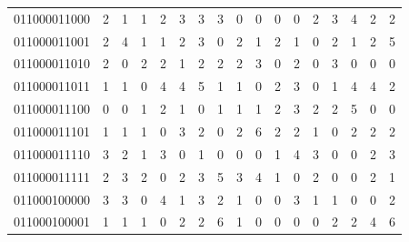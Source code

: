 \documentclass[10pt,a4paper]{article}
\begin{document}
\begin{longtable}{ |c|c|c|c|c|c|c|c|c|c|c|c|c|c|c|c|c| }
    011000011000              & 2                            & 1                                & 1                            & 2                              & 3   & 3   & 3   & 0   & 0   & 0   & 0   & 2   & 3   & 4   & 2   & 2   \\
    011000011001              & 2                            & 4                                & 1                            & 1                              & 2   & 3   & 0   & 2   & 1   & 2   & 1   & 0   & 2   & 1   & 2   & 5   \\
    011000011010              & 2                            & 0                                & 2                            & 2                              & 1   & 2   & 2   & 2   & 3   & 0   & 2   & 0   & 3   & 0   & 0   & 0   \\
    011000011011              & 1                            & 1                                & 0                            & 4                              & 4   & 5   & 1   & 1   & 0   & 2   & 3   & 0   & 1   & 4   & 4   & 2   \\
    011000011100              & 0                            & 0                                & 1                            & 2                              & 1   & 0   & 1   & 1   & 1   & 2   & 3   & 2   & 2   & 5   & 0   & 0   \\
    011000011101              & 1                            & 1                                & 1                            & 0                              & 3   & 2   & 0   & 2   & 6   & 2   & 2   & 1   & 0   & 2   & 2   & 2   \\
    011000011110              & 3                            & 2                                & 1                            & 3                              & 0   & 1   & 0   & 0   & 0   & 1   & 4   & 3   & 0   & 0   & 2   & 3   \\
    011000011111              & 2                            & 3                                & 2                            & 0                              & 2   & 3   & 5   & 3   & 4   & 1   & 0   & 2   & 0   & 0   & 2   & 1   \\
    011000100000              & 3                            & 3                                & 0                            & 4                              & 1   & 3   & 2   & 1   & 0   & 0   & 3   & 1   & 1   & 0   & 0   & 2   \\
    011000100001              & 1                            & 1                                & 1                            & 0                              & 2   & 2   & 6   & 1   & 0   & 0   & 0   & 0   & 2   & 2   & 4   & 6   \\

\end{longtable}
\end{document}
